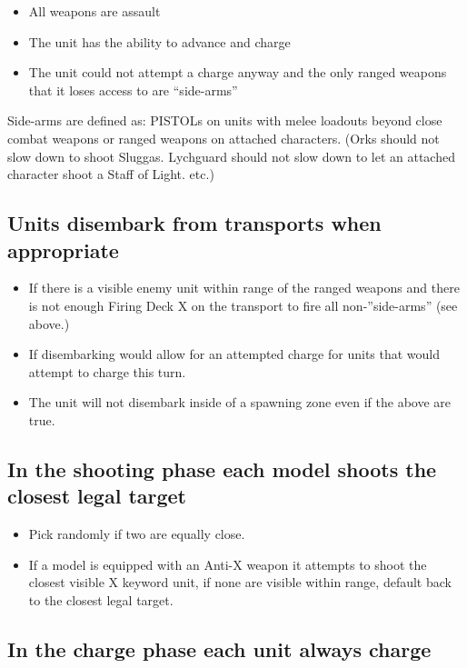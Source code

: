 \documentclass{HordeModeTarot}
\begin{document}
\begin{itemize}
\item{} All weapons are assault
\item{} The unit has the ability to advance and charge
\item{} The unit could not attempt a charge anyway and the only ranged weapons that it loses access to are “side-arms”
\end{itemize}

Side-arms are defined as: PISTOLs on units with melee loadouts beyond close combat weapons or ranged weapons on attached characters. (Orks should not slow down to shoot Sluggas.  Lychguard should not slow down to let an attached character shoot a Staff of Light. etc.)

\subsection*{Units disembark from transports when appropriate}

\begin{itemize}
\item{} If there is a visible enemy unit within range of the ranged weapons and there is not enough Firing Deck X on the transport to fire all non-”side-arms” (see above.)
\item{} If disembarking would allow for an attempted charge for units that would attempt to charge this turn.
\item{} The unit will not disembark inside of a spawning zone even if the above are true.
\end{itemize}

\subsection*{In the shooting phase each model shoots the closest legal target}

\begin{itemize}
\item{} Pick randomly if two are equally close.
\item{} If a model is equipped with an Anti-X weapon it attempts to shoot the closest visible X keyword unit, if none are visible within range, default back to the closest legal target.
\end{itemize}

\subsection*{In the charge phase each unit always charge}
\end{document}
